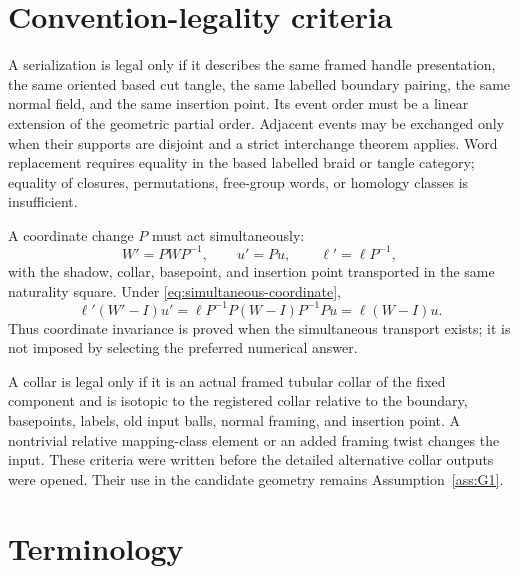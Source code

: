 \documentclass[10pt,reqno]{amsart}
\theoremstyle{definition}
\theoremstyle{remark}
\begin{document}
\section{Convention-legality criteria}\label{app:legality}

A serialization is legal only if it describes the same framed handle
presentation, the same oriented based cut tangle, the same labelled boundary
pairing, the same normal field, and the same insertion point.  Its event order
must be a linear extension of the geometric partial order.  Adjacent events
may be exchanged only when their supports are disjoint and a strict
interchange theorem applies.  Word replacement requires equality in the
based labelled braid or tangle category; equality of closures, permutations,
free-group words, or homology classes is insufficient.

A coordinate change $P$ must act simultaneously:
\begin{equation}\label{eq:simultaneous-coordinate}
W'=PWP^{-1},\qquad u'=Pu,\qquad
\ell'=\ell P^{-1},
\end{equation}
with the shadow, collar, basepoint, and insertion point transported in the
same naturality square.  Under \cref{eq:simultaneous-coordinate},
\begin{equation}\label{eq:coordinate-invariance}
\ell'(W'-I)u'=\ell P^{-1}P(W-I)P^{-1}Pu=\ell(W-I)u.
\end{equation}
Thus coordinate invariance is proved when the simultaneous transport exists;
it is not imposed by selecting the preferred numerical answer.

A collar is legal only if it is an actual framed tubular collar of the fixed
component and is isotopic to the registered collar relative to the boundary,
basepoints, labels, old input balls, normal framing, and insertion point.  A
nontrivial relative mapping-class element or an added framing twist changes
the input.  These criteria were written before the detailed alternative
collar outputs were opened.  Their use in the candidate geometry remains
Assumption~\ref{ass:G1}.

\section{Terminology}\label{app:glossary}
\end{document}
